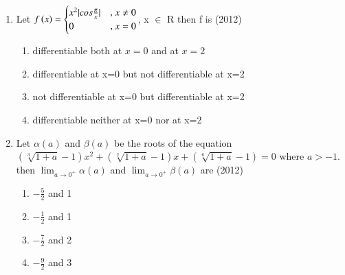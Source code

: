 \documentclass[journal,12pt,twocolumn]{IEEEtran}
\theoremstyle{remark}
\begin{document}
\begin{enumerate}
\item 
	Let $f\left(x\right) =\begin{cases} x^2|cos \frac{\pi}{x}| & \text{, } x \neq 0 \\ 0 & \text{, } x = 0 
\end{cases}$, x $\in$ R then f is
\hfill{(2012)} 
\begin{enumerate}[label=\alph*)]
    \item differentiable both at $x=0$ and at $x=2$
    \item differentiable at x=0 but not differentiable at x=2
    \item not differentiable at x=0 but differentiable at x=2
    \item differentiable neither at x=0 nor at x=2 \\
\end{enumerate}
\item 
Let $\alpha(a)$ and $\beta(a)$ be the roots of the equation $(\sqrt[3]{1+a}-1)x^2+(\sqrt[2]{1+a}-1)x+(\sqrt[6]{1+a}-1)=0$ where $a>-1$. then $\lim_{a \to 0^+}{\alpha(a)}$ and $\lim_{a \to 0^+}{\beta(a)}$ are
\hfill{(2012)} 

\begin{enumerate}[label=\alph*)]
    \item $-\frac{5}{2}$ and 1
    \item $-\frac{1}{2}$ and 1
    \item $-\frac{7}{2}$ and 2
    \item $-\frac{9}{2}$ and 3 \\
\end{enumerate}


\end{enumerate}
\end{document}
